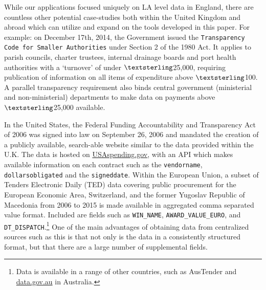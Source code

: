 \documentclass[11pt]{article}
\begin{document}
While our applications focused uniquely on LA level data in England, there are countless other potential case-studies both within the United Kingdom and abroad which can utilize and expand on the tools developed in this paper. For example: on December 17th, 2014, the Government issued the \texttt{Transparency Code for Smaller Authorities} under Section 2 of the 1980 Act. It applies to parish councils, charter trustees, internal drainage boards and port health authorities with a `turnover’ of under $\textsterling$25,000, requiring publication of information on all items of expenditure above $\textsterling$100. A parallel transparency requirement also binds central government (ministerial and non-ministerial) departments to make data on payments above $\textsterling$25,000 available.

In the United States, the Federal Funding Accountability and Transparency Act of 2006 was signed into law on September 26, 2006 and mandated the creation of a publicly available, search-able website similar to the data provided within the U.K. The data is hosted on \url{USAspending.gov}, with an API which makes available information on each contract such as the \texttt{vendorname}, \texttt{dollarsobligated} and the \texttt{signeddate}. Within the European Union, a subset of Tenders Electronic Daily (TED) data covering public procurement for the European Economic Area, Switzerland, and the former Yugoslav Republic of Macedonia from 2006 to 2015 is made available in aggregated comma separated value format. Included are fields such as \texttt{WIN\_NAME}, \texttt{AWARD\_VALUE\_EURO}, and \texttt{DT\_DISPATCH}.\footnote{Data is available in a range of other countries, such as AusTender and \url{data.gov.au} in Australia.} One of the main advantages of obtaining data from centralized sources such as this is that not only is the data in a consistently structured format, but that there are a large number of supplemental fields.
\end{document}
